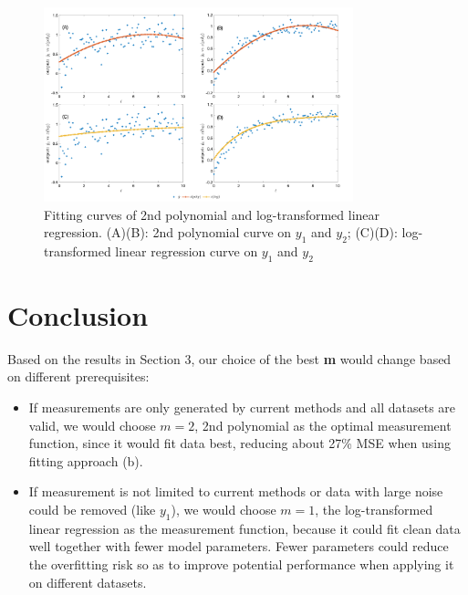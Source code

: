 \documentclass[11pt,a4paper,fleqn]{article}
\begin{document}
    \makeatletter
    \setlength{\@fptop}{0pt}
    \makeatother
    \begin{figure}[t!]
        \centering
        \includegraphics[width=0.8\textwidth]{m2_log_fit.png}
        \vspace{-0.5cm}
        \caption{Fitting curves of 2nd polynomial and log-transformed linear regression. (A)(B): 2nd polynomial curve on $y_1$ and $y_2$; (C)(D): log-transformed linear regression curve on $y_1$ and $y_2$}
        \label{fig:2}
    \end{figure}

    \section{Conclusion}
    Based on the results in Section 3, our choice of the best \textbf{m} would change based on different prerequisites:
    \begin{itemize}
    \item If measurements are only generated by current methods and all datasets are valid, we would choose $m=2$, 2nd polynomial as the optimal measurement function, since it would fit data best, reducing about 27\% MSE when using fitting approach (b). 
    \item If measurement is not limited to current methods or data with large noise could be removed (like $y_1$), we would choose $m=1$, the log-transformed linear regression as the measurement function, because it could fit clean data well together with fewer model parameters. Fewer parameters could reduce the overfitting risk so as to improve potential performance when applying it on different datasets. 
    \end{itemize}
\end{document}
